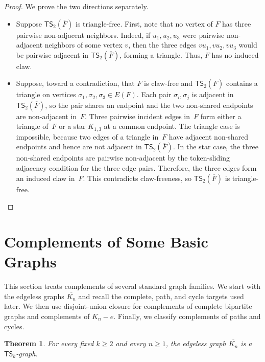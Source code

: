 \documentclass[a4paper]{article}
\theoremstyle{plain}
\newtheorem{theorem}{Theorem}[section]
\theoremstyle{definition}
\newcommand{\TSsym}{\mathsf{TS}}
\numberwithin{equation}{section}
\begin{document}
\begin{proof}
We prove the two directions separately.
\begin{itemize}
\item[$(\Rightarrow)$]
Suppose $\TSsym_2(\overline{F})$ is triangle-free.
First, note that no vertex of $F$ has three pairwise non-adjacent neighbors.
Indeed, if $u_1,u_2,u_3$ were pairwise non-adjacent neighbors of some vertex $v$, then the three edges $vu_1,vu_2,vu_3$ would be pairwise adjacent in $\TSsym_2(\overline{F})$, forming a triangle.
Thus, $F$ has no induced claw.

\item[$(\Leftarrow)$]
Suppose, toward a contradiction, that $F$ is claw-free and $\TSsym_2(\overline{F})$ contains a triangle on vertices $\sigma_1,\sigma_2,\sigma_3\in E(F)$.
Each pair $\sigma_i,\sigma_j$ is adjacent in $\TSsym_2(\overline{F})$, so the pair shares an endpoint and the two non-shared endpoints are non-adjacent in~$F$.
Three pairwise incident edges in~$F$ form either a triangle of~$F$ or a star $K_{1,3}$ at a common endpoint.
The triangle case is impossible, because two edges of a triangle in~$F$ have adjacent non-shared endpoints and hence are not adjacent in $\TSsym_2(\overline{F})$.
In the star case, the three non-shared endpoints are pairwise non-adjacent by the token-sliding adjacency condition for the three edge pairs.
Therefore, the three edges form an induced claw in~$F$.
This contradicts claw-freeness, so $\TSsym_2(\overline{F})$ is triangle-free.
\end{itemize}
\end{proof}


\section{Complements of Some Basic Graphs}
\label{sec:basic-complements}

This section treats complements of several standard graph families.
We start with the edgeless graphs $\overline{K_n}$ and recall the complete, path, and cycle targets used later.
We then use disjoint-union closure for complements of complete bipartite graphs and complements of $K_n-e$.
Finally, we classify complements of paths and cycles.

\begin{theorem}
\label{thm:edgeless}
For every fixed $k\ge 2$ and every $n\ge 1$, the edgeless graph $\overline{K_n}$ is a $\TSsym_k$-graph.
\end{theorem}
\end{document}
